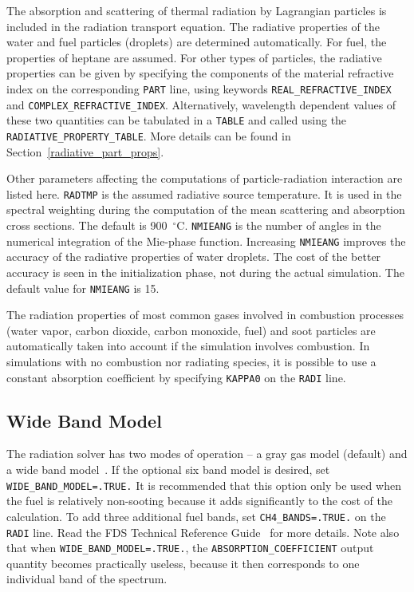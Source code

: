 \documentclass[11pt]{book}
\newcommand{\ct}{\tt\small}
\begin{document}
The absorption and scattering of thermal radiation by Lagrangian particles is included in the radiation transport equation. The radiative properties of
the water and fuel particles (droplets) are determined automatically. For fuel, the properties of heptane are assumed. For other types of particles, the
radiative properties can be given by specifying the components of the material refractive index on the corresponding {\ct PART} line, using keywords
{\ct REAL\_REFRACTIVE\_INDEX} and {\ct COMPLEX\_REFRACTIVE\_INDEX}. Alternatively, wavelength dependent values of these two
quantities can be tabulated in a {\ct TABLE} and called using the {\ct RADIATIVE\_PROPERTY\_TABLE}. More details can be found in Section~\ref{radiative_part_props}.

Other parameters affecting the computations of particle-radiation interaction are listed here. {\ct RADTMP} is the assumed radiative source temperature.
It is used in the spectral weighting during the computation of the mean scattering and absorption cross sections. The default is 900~$^\circ$C.
{\ct NMIEANG} is the number of angles in the numerical integration of the Mie-phase function.
Increasing {\ct NMIEANG} improves the accuracy of the radiative properties of water droplets. The cost
of the better accuracy is seen in the initialization phase, not during the actual simulation. The default value for {\ct NMIEANG}
is 15.

The radiation properties of most common gases involved in combustion processes (water vapor, carbon dioxide, carbon monoxide, fuel) and
soot particles are automatically taken into account if the simulation involves combustion. In simulations with no combustion nor radiating species, it is
possible to use a constant absorption coefficient by specifying {\ct KAPPA0} on the {\ct RADI} line.


\subsection{Wide Band Model}

\label{info:RADI_Wide_Band}

The radiation solver has two modes of
operation -- a gray gas model (default) and a wide band model~\cite{FDS_Math_Guide}.
If the optional six band model is desired,
set {\ct WIDE\_BAND\_MODEL=.TRUE.} It is recommended that this option
only be used when the fuel is relatively non-sooting because it
adds significantly to the cost of the calculation. To add three
additional fuel bands, set {\ct CH4\_BANDS=.TRUE.} on the {\ct RADI} line. Read the FDS Technical
Reference Guide~\cite{FDS_Tech_Guide} for more details. Note also that when
{\ct WIDE\_BAND\_MODEL=.TRUE.}, the {\ct ABSORPTION\_COEFFICIENT}
output quantity becomes practically useless, because it then
corresponds to one individual band of the spectrum.
\end{document}
